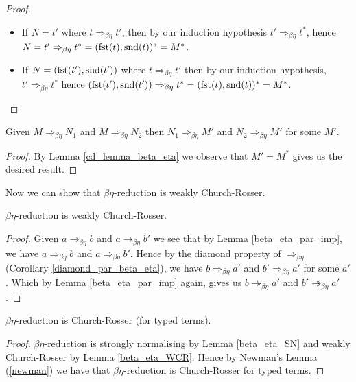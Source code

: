\begin{proof}
\begin{itemize}
\begin{itemize}
            \item If $N = t'$ where $t \Rightarrow_{\beta\eta} t'$, then by our induction hypothesis $t' \Rightarrow_{\beta\eta} t^*$, hence $N = t' \Rightarrow_{\beta\eta} t^* = (\mathrm{fst}(t), \mathrm{snd}(t))^* = M^*$.
            \item If $N = (\mathrm{fst}(t'), \mathrm{snd}(t'))$ where $t \Rightarrow_{\beta\eta} t'$ then by our induction hypothesis, $t' \Rightarrow_{\beta\eta} t^*$ hence $(\mathrm{fst}(t'), \mathrm{snd}(t')) \Rightarrow_{\beta\eta} t^* = (\mathrm{fst} (t), \mathrm{snd}(t))^* = M^*$.
        \end{itemize}
    \end{itemize}
\end{proof}

\begin{cor}\label{diamond_par_beta_eta}
    Given $M \Rightarrow_{\beta\eta} N_1$ and $M \Rightarrow_{\beta\eta} N_2$ then $N_1 \Rightarrow_{\beta\eta} M'$ and $N_2 \Rightarrow_{\beta\eta} M'$ for some $M'$.
\end{cor}

\begin{proof}
    By Lemma \ref{cd_lemma_beta_eta} we observe that $M' = M^*$ gives us the desired result.
\end{proof}

Now we can show that $\beta\eta$-reduction is weakly Church-Rosser.

\begin{lemma}\label{beta_eta_WCR}
    $\beta\eta$-reduction is weakly Church-Rosser.
\end{lemma}

\begin{proof}
    Given $a \to_{\beta\eta} b$ and $a \to_{\beta\eta} b'$ we see that by Lemma \ref{beta_eta_par_imp}, we have $a \Rightarrow_{\beta\eta} b$ and $a \Rightarrow_{\beta\eta} b'$. Hence by the diamond property of $\Rightarrow_{\beta\eta}$ (Corollary \ref{diamond_par_beta_eta}), we have $b \Rightarrow_{\beta\eta} a'$ and $b' \Rightarrow_{\beta\eta} a'$ for some $a'$. Which by Lemma \ref{beta_eta_par_imp} again, gives us $b \twoheadrightarrow_{\beta\eta} a'$ and $b' \twoheadrightarrow_{\beta\eta} a'$.
\end{proof}

\begin{theorem}
    $\beta\eta$-reduction is Church-Rosser (for typed terms).
\end{theorem}

\begin{proof}
    $\beta\eta$-reduction is strongly normalising by Lemma \ref{beta_eta_SN} and weakly Church-Rosser by Lemma \ref{beta_eta_WCR}. Hence by Newman's Lemma (\ref{newman}) we have that $\beta\eta$-reduction is Church-Rosser for typed terms. 
\end{proof}

